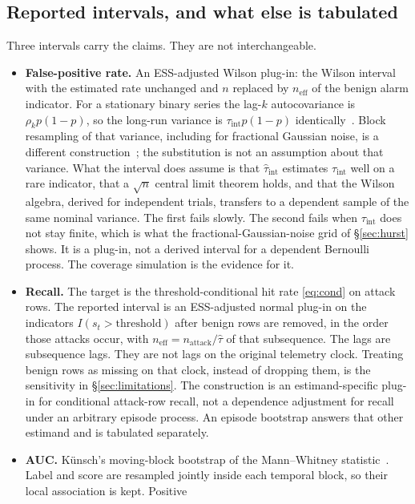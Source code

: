 \documentclass[a4paper,fleqn]{cas-dc}
\newcommand{\neff}{n_{\mathrm{eff}}}
\begin{document}
\subsection{Reported intervals, and what else is tabulated}
Three intervals carry the claims. They are not interchangeable.
\begin{itemize}
\item \textbf{False-positive rate.} An ESS-adjusted Wilson plug-in: the Wilson
interval~\citep{wilson1927probable,brown2001interval,mcgrath2024binomial} with the
estimated rate unchanged and $n$ replaced by $\neff$ of the benign alarm indicator. For a
stationary binary series the lag-$k$ autocovariance is $\rho_k p(1-p)$, so the long-run variance
is $\tau_{\mathrm{int}}p(1-p)$ identically~\citep{newey1987simple}. Block resampling of that variance, including for
fractional Gaussian noise, is a different construction~\citep{zhang2022block}; the substitution is not an assumption about that
variance. What the interval does assume is that $\hat\tau_{\mathrm{int}}$ estimates
$\tau_{\mathrm{int}}$ well on a rare indicator, that a $\sqrt{n}$ central limit theorem holds, and
that the Wilson algebra, derived for independent trials, transfers to a dependent sample of the
same nominal variance. The first fails slowly. The second fails when $\tau_{\mathrm{int}}$ does not stay
finite, which is what the fractional-Gaussian-noise grid of \S\ref{sec:hurst} shows. It
is a plug-in, not a derived interval for a dependent Bernoulli process. The coverage simulation is
the evidence for it.
\item \textbf{Recall.} The target is the threshold-conditional hit rate \eqref{eq:cond} on attack
rows. The reported interval is an ESS-adjusted normal plug-in on the indicators
$I(s_t>\mathrm{threshold})$ after benign rows are removed, in the order those attacks occur, with
$\neff=n_{\mathrm{attack}}/\hat\tau$ of that subsequence. The lags are subsequence lags. They are
not lags on the original telemetry clock. Treating benign rows as missing on that clock, instead of
dropping them, is the sensitivity in \S\ref{sec:limitations}. The construction is an estimand-specific plug-in for
conditional attack-row recall, not a dependence adjustment for recall under an arbitrary episode
process. An episode bootstrap answers that other estimand and is tabulated separately.
\item \textbf{AUC.} K\"unsch's moving-block bootstrap of the Mann--Whitney
statistic~\citep{kunsch1989jackknife,mann1947test,dehling2010ustat}. Label and
score are resampled jointly inside each temporal block, so their local association is kept. Positive

\end{itemize}
\end{document}
